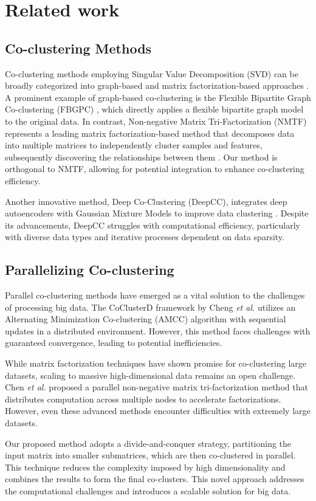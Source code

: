 
\section{Related work}
\label{sec:related_work}
\subsection{Co-clustering Methods}
Co-clustering methods employing Singular Value Decomposition (SVD) can be broadly categorized into graph-based and matrix factorization-based approaches
\cite{dhillon2001CoclusteringDocumentsWords}. A prominent example of graph-based co-clustering is the Flexible Bipartite Graph Co-clustering (FBGPC) \cite{chen2023FastFlexibleBipartitea}, which directly applies a flexible bipartite graph model to the original data. In contrast, Non-negative Matrix Tri-Factorization (NMTF) represents a leading matrix factorization-based method that decomposes data into multiple matrices to independently cluster samples and features, subsequently discovering the relationships between them \cite{long2005CoclusteringBlockValue}. Our method is orthogonal to NMTF, allowing for potential integration to enhance co-clustering efficiency.

Another innovative method, Deep Co-Clustering (DeepCC), integrates deep autoencoders with Gaussian Mixture Models to improve data clustering \cite{dongkuanxu2019DeepCoClustering}. Despite its advancements, DeepCC struggles with computational efficiency, particularly with diverse data types and iterative processes dependent on data sparsity.

\subsection{Parallelizing Co-clustering}

Parallel co-clustering methods have emerged as a vital solution to the challenges of processing big data. The CoClusterD framework by Cheng \textit{et al.} \cite{cheng2015CoClusterDDistributedFramework} utilizes an Alternating Minimization Co-clustering (AMCC) algorithm with sequential updates in a distributed environment. However, this method faces challenges with guaranteed convergence, leading to potential inefficiencies.

While matrix factorization techniques have shown promise for co-clustering large datasets, scaling to massive high-dimensional data remains an open challenge. Chen \textit{et al.}\cite{chen2023ParallelNonNegativeMatrix} proposed a parallel non-negative matrix tri-factorization method that distributes computation across multiple nodes to accelerate factorizations. However, even these advanced methods encounter difficulties with extremely large datasets.

Our proposed method adopts a divide-and-conquer strategy, partitioning the input matrix into smaller submatrices, which are then co-clustered in parallel. This technique reduces the complexity imposed by high dimensionality and combines the results to form the final co-clusters. This novel approach addresses the computational challenges and introduces a scalable solution for big data.